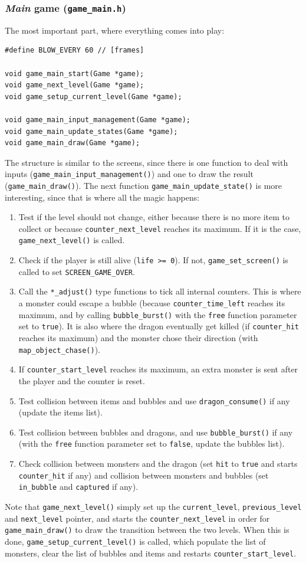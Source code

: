 \documentclass[12pt,a4paper]{article}
\newcommand{\cc}[1]{\texttt{#1}}
\begin{document}
\subsubsection{\textit{Main} game (\texttt{game\_main.h})}

The most important part, where everything comes into play:\begin{verbatim}
#define BLOW_EVERY 60 // [frames]

void game_main_start(Game *game);
void game_next_level(Game *game);
void game_setup_current_level(Game *game);

void game_main_input_management(Game *game);
void game_main_update_states(Game *game);
void game_main_draw(Game *game);
\end{verbatim}

The structure is similar to the screens, since there is one function to deal with inputs (\cc{game_main_input_management()}) and one to draw the result (\cc{game_main_draw()}). The next function \cc{game_main_update_state()} is more interesting, since that is where all the magic happens:\begin{enumerate}
\item Test if the level should not change, either because there is no more item to collect or because \cc{counter_next_level} reaches its maximum. If it is the case, \cc{game_next_level()} is called.
\item Check if the player is still alive (\cc{life >= 0}). If not, \cc{game_set_screen()} is called to set \cc{SCREEN_GAME_OVER}.
\item Call the \cc{*_adjust()} type functions to tick all internal counters. This is where a monster could escape a bubble (because \cc{counter_time_left} reaches its maximum, and by calling \cc{bubble_burst()} with the \cc{free} function parameter set to \cc{true}). It is also where the dragon eventually get killed (if \cc{counter_hit} reaches its maximum) and the monster chose their direction (with \cc{map_object_chase()}).
\item If \cc{counter_start_level} reaches its maximum, an extra monster is sent after the player and the counter is reset.
\item Test collision between items and bubbles and use \cc{dragon_consume()} if any (update the items list).
\item Test collision between bubbles and dragons, and use \cc{bubble_burst()} if any (with the \cc{free} function parameter set to \cc{false}, update the bubbles list).
\item Check collision between monsters and the dragon (set \cc{hit} to \cc{true} and starts \cc{counter_hit} if any) and collision between monsters and bubbles (set \cc{in_bubble} and \cc{captured} if any).
\end{enumerate}
Note that \cc{game_next_level()} simply set up the \cc{current_level}, \cc{previous_level} and \cc{next_level} pointer, and starts the \cc{counter_next_level} in order for \cc{game_main_draw()} to draw the transition between the two levels. When this is done, \cc{game_setup_current_level()} is called, which populate the list of monsters, clear the list of bubbles and items and restarts \cc{counter_start_level}.
\end{document}
